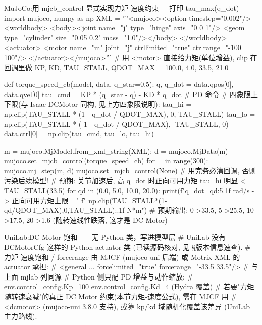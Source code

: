 \begin{codebox}[Python]{MuJoCo:用 mjcb\_control 显式实现力矩-速度约束 + 打印 tau\_max(q\_dot)}
import mujoco, numpy as np
XML = '''<mujoco><option timestep="0.002"/><worldbody>
  <body><joint name="j" type="hinge" axis="0 0 1"/>
  <geom type="cylinder" size="0.05 0.2" mass="1.0"/></body>
  </worldbody><actuator>
  <motor name="m" joint="j" ctrllimited="true" ctrlrange="-100 100"/>
  </actuator></mujoco>'''                       # 用 <motor> 直接给力矩(单位增益), clip 在回调里做
KP, KD, TAU_STALL, QDOT_MAX = 100.0, 4.0, 33.5, 21.0

def torque_speed_cb(model, data, q_star=0.5):
    q, q_dot = data.qpos[0], data.qvel[0]
    tau_cmd = KP * (q_star - q) - KD * q_dot      # PD 命令
    # 四象限上下限(与 Isaac DCMotor 同构, 见上方四象限说明):
    tau_hi = np.clip(TAU_STALL * (1 - q_dot / QDOT_MAX),  0, TAU_STALL)
    tau_lo = np.clip(TAU_STALL * (-1 - q_dot / QDOT_MAX), -TAU_STALL, 0)
    data.ctrl[0] = np.clip(tau_cmd, tau_lo, tau_hi)

m = mujoco.MjModel.from_xml_string(XML); d = mujoco.MjData(m)
mujoco.set_mjcb_control(torque_speed_cb)
for _ in range(300): mujoco.mj_step(m, d)
mujoco.set_mjcb_control(None)                     # 用完务必清回调, 否则污染后续模型!
# 预期: 关节加速后, 高 q_dot 时正向可用力矩 tau_hi 明显 < TAU_STALL(33.5)
for qd in (0.0, 5.0, 10.0, 20.0):
    print(f"q_dot={qd:5.1f} rad/s -> 正向可用力矩上限 ="
          f" {np.clip(TAU_STALL*(1-qd/QDOT_MAX),0,TAU_STALL):.1f} N*m")
# 预期输出: 0->33.5, 5->25.5, 10->17.5, 20->1.6  (随转速线性跌落, 这才是 DC Motor)
\end{codebox}

\begin{codebox}[Python]{UniLab:DC Motor 饱和——无 Python 类，写进模型层}
# UniLab 没有 DCMotorCfg 这样的 Python actuator 类 (已读源码核对, 见 §版本信息速查).
# 力矩-速度饱和 / forcerange 由 MJCF (mujoco-uni 后端) 或 Motrix XML 的 actuator 承担:
#   <general ... forcelimited="true" forcerange="-33.5 33.5"/>   # 与上面 mjlab 列同源
# Python 侧只配 PD 增益与动作缩放:
#   env.control_config.Kp=100  env.control_config.Kd=4  (Hydra 覆盖)
# 若要"力矩随转速衰减"的真正 DC Motor 约束(本节力矩-速度公式), 需在 MJCF 用
#   <dcmotor> (mujoco-uni 3.8.0 支持), 或靠 kp/kd 域随机化覆盖该差异 (UniLab 主力路线).
\end{codebox}


